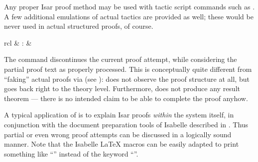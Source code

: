 \begin{isabellebody}
\begin{isamarkuptext}
\begin{descr}
  \end{descr}

  Any proper Isar proof method may be used with tactic script commands
  such as \mbox{}.  A few additional emulations of actual
  tactics are provided as well; these would be never used in actual
  structured proofs, of course.%
\end{isamarkuptext}%
\isamarkuptrue%
%
\isamarkuptrue%
%
\begin{isamarkuptext}%
\begin{matharray}{rcl}
    \mbox{} & : &  \\
  \end{matharray}

  The \mbox{} command discontinues the current proof
  attempt, while considering the partial proof text as properly
  processed.  This is conceptually quite different from ``faking''
  actual proofs via \mbox{} (see
  ): \mbox{} does not observe the
  proof structure at all, but goes back right to the theory level.
  Furthermore, \mbox{} does not produce any result theorem
  --- there is no intended claim to be able to complete the proof
  anyhow.

  A typical application of \mbox{} is to explain Isar proofs
  \emph{within} the system itself, in conjunction with the document
  preparation tools of Isabelle described in \cite{isabelle-sys}.
  Thus partial or even wrong proof attempts can be discussed in a
  logically sound manner.  Note that the Isabelle {\LaTeX} macros can
  be easily adapted to print something like ``\isa{{\isachardoublequote}{\isasymdots}{\isachardoublequote}}'' instead of
  the keyword ``\mbox{}''.


\end{isamarkuptext}
\end{isabellebody}
